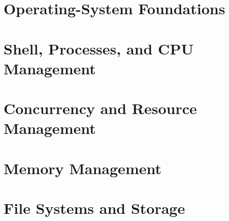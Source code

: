 \documentclass[11pt,oneside,a4paper]{report}
\begin{document}
\cleardoublepage
{}

\part{Operating-System Foundations}



\part{Shell, Processes, and CPU Management}



\part{Concurrency and Resource Management}



\part{Memory Management}



\part{File Systems and Storage}




\end{document}
